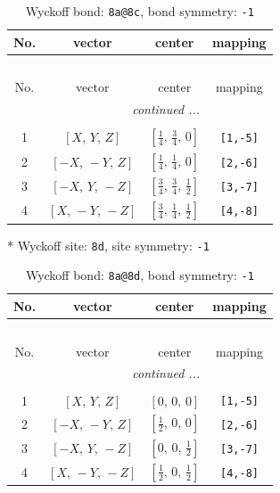 \documentclass[fleqn,8pt]{jsarticle}
\begin{document}
\begin{longtable}{cccc}
\caption{Wyckoff bond: {\tt 8a@8c}, bond symmetry: {\tt -1}}
 \\
 \hline \hline
No. & vector & center & mapping \\ \hline \endfirsthead

\multicolumn{3}{l}{\tablename\ \thetable{}} \\
 \hline \hline
No. & vector & center & mapping \\ \hline \endhead

 \hline \hline
\multicolumn{3}{r}{\footnotesize\it continued ...} \\ \endfoot

 \hline \hline
\multicolumn{3}{r}{} \\ \endlastfoot

1 & $\left[ X,\, Y,\, Z \right]$ & $\left[ \frac{1}{4},\, \frac{3}{4},\, 0 \right]$ & {\tt [1,-5]} \\ \hline
2 & $\left[ - X,\, - Y,\, Z \right]$ & $\left[ \frac{1}{4},\, \frac{1}{4},\, 0 \right]$ & {\tt [2,-6]} \\ \hline
3 & $\left[ - X,\, Y,\, - Z \right]$ & $\left[ \frac{3}{4},\, \frac{3}{4},\, \frac{1}{2} \right]$ & {\tt [3,-7]} \\ \hline
4 & $\left[ X,\, - Y,\, - Z \right]$ & $\left[ \frac{3}{4},\, \frac{1}{4},\, \frac{1}{2} \right]$ & {\tt [4,-8]} \\
\end{longtable}
* Wyckoff site: {\tt 8d}, site symmetry: {\tt -1}
\renewcommand{\arraystretch}{1.2}
\begin{longtable}{cccc}
\caption{Wyckoff bond: {\tt 8a@8d}, bond symmetry: {\tt -1}}
 \\
 \hline \hline
No. & vector & center & mapping \\ \hline \endfirsthead

\multicolumn{3}{l}{\tablename\ \thetable{}} \\
 \hline \hline
No. & vector & center & mapping \\ \hline \endhead

 \hline \hline
\multicolumn{3}{r}{\footnotesize\it continued ...} \\ \endfoot

 \hline \hline
\multicolumn{3}{r}{} \\ \endlastfoot

1 & $\left[ X,\, Y,\, Z \right]$ & $\left[ 0,\, 0,\, 0 \right]$ & {\tt [1,-5]} \\ \hline
2 & $\left[ - X,\, - Y,\, Z \right]$ & $\left[ \frac{1}{2},\, 0,\, 0 \right]$ & {\tt [2,-6]} \\ \hline
3 & $\left[ - X,\, Y,\, - Z \right]$ & $\left[ 0,\, 0,\, \frac{1}{2} \right]$ & {\tt [3,-7]} \\ \hline
4 & $\left[ X,\, - Y,\, - Z \right]$ & $\left[ \frac{1}{2},\, 0,\, \frac{1}{2} \right]$ & {\tt [4,-8]} \\
\end{longtable}
\end{document}
